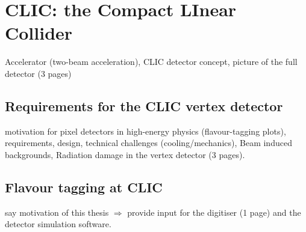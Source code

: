 \chapter{CLIC: the Compact LInear Collider}
\label{ch:CLIC}
Accelerator (two-beam acceleration), CLIC detector concept, picture of
the full detector (3 pages)

\section{Requirements for the CLIC vertex detector}
motivation for pixel detectors in high-energy physics (flavour-tagging
plots), requirements, design, technical challenges
(cooling/mechanics), Beam induced backgrounds, Radiation damage in the
vertex detector (3 pages).


\section{Flavour tagging at CLIC}
say motivation of this thesis $\Rightarrow$ provide input for the
digitiser (1 page) and the detector simulation software.
